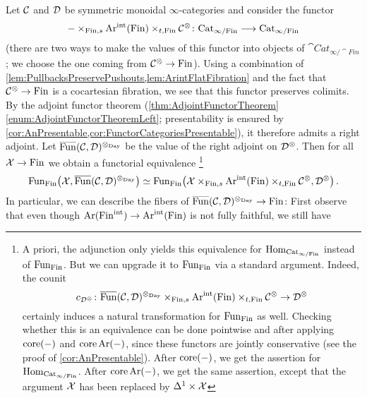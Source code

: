 \begin{con}\label{con:DayConvolution}
	 Let $\mathcal{C}$ and $\mathcal{D}$ be symmetric monoidal $\infty$-categories and consider the functor
	 \begin{equation*}
	 	-\times_{\mathrm{Fin},s}\operatorname{Ar}^\mathrm{int}(\mathrm{Fin})\times_{t,\mathrm{Fin}}\mathcal{C}^\otimes\colon \mathrm{Cat}_{\infty/\mathrm{Fin}}\longrightarrow \mathrm{Cat}_{\infty/\mathrm{Fin}}
	 \end{equation*}
	 (there are two ways to make the values of this functor into objects of $\cat{Cat}_{\infty/\cat{Fin}}$; we choose the one coming from $\mathcal{C}^\otimes\rightarrow \mathrm{Fin}$). Using a combination of \cref{lem:PullbacksPreservePushouts,lem:ArintFlatFibration} and the fact that $\mathcal{C}^\otimes\rightarrow \mathrm{Fin}$ is a cocartesian fibration, we see that this functor preserves colimits. By the adjoint functor theorem (\cref{thm:AdjointFunctorTheorem}\cref{enum:AdjointFunctorTheoremLeft}; presentability is ensured by \cref{cor:AnPresentable,cor:FunctorCategoriesPresentable}), it therefore admits a right adjoint. Let $\ov{\Fun}(\Cc,\Dd)^{\otimes_{\mathrm{Day}}}$ be the value of the right adjoint on $\mathcal{D}^\otimes$. Then for all $\mathcal{X}\rightarrow \mathrm{Fin}$ we obtain a functorial equivalence%
	 \footnote{A priori, the adjunction only yields this equivalence for $\operatorname{Hom}_{\mathrm{Cat}_{\infty/\mathrm{Fin}}}$ instead of $\operatorname{Fun}_{\mathrm{Fin}}$. But we can upgrade it to $\operatorname{Fun}_{\mathrm{Fin}}$ via a standard argument. Indeed, the counit
	 \begin{equation*}
	 	c_{\Dd^\otimes}\colon \ov{\Fun}(\Cc,\Dd)^{\otimes_{\mathrm{Day}}}\times_{\cat{Fin},s}\Ar^\mathrm{int}(\cat{Fin})\times_{t,\cat{Fin}}\Cc^\otimes\rightarrow \Dd^\otimes
	 \end{equation*}
	 certainly induces a natural transformation for $\operatorname{Fun}_{\mathrm{Fin}}$ as well. Checking whether this is an equivalence can be done pointwise and after applying $\operatorname{core}(-)$ and $\operatorname{core}\operatorname{Ar}(-)$, since these functors are jointly conservative (see the proof of \cref{cor:AnPresentable}). After $\operatorname{core}(-)$, we get the assertion for $\operatorname{Hom}_{\mathrm{Cat}_{\infty/\mathrm{Fin}}}$. After $\operatorname{core}\operatorname{Ar}(-)$, we get the same assertion, except that the argument $\mathcal{X}$ has been replaced by $\Delta^1\times \mathcal{X}$}
	 \begin{equation*}
	 	\Fun_{\cat{Fin}}\bigl(\Xx,\ov{\Fun}(\Cc,\Dd)^{\otimes_{\mathrm{Day}}}\bigr)\simeq\Fun_{\cat{Fin}}\bigl(\Xx\times_{\cat{Fin},s}\Ar^\mathrm{int}(\cat{Fin})\times_{t,\cat{Fin}}\Cc^\otimes,\Dd^\otimes\bigr)\,.
	 \end{equation*}
	 In particular, we can describe the fibers of $\ov{\Fun}(\Cc,\Dd)^{\otimes_{\mathrm{Day}}}\rightarrow\cat{Fin}$: First observe that even though $\operatorname{Ar}(\mathrm{Fin}^ \mathrm{int})\rightarrow \operatorname{Ar}^\mathrm{int}(\mathrm{Fin})$ is not fully faithful, we still have

\end{con}
